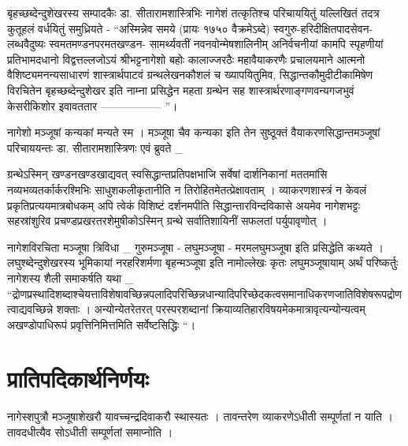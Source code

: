 बृहच्छब्देन्दुशेखरस्य सम्पादकैः डा. सीतारामशास्त्रिभिः नागेशं तत्कृतिश्च परिचाययितुं यल्लिखितं तदत्र कुतूहलं वर्धयितुं समुध्रियते - “अस्मिन्नेव समये (प्रायः १७५० वैक्रमेऽब्दे) स्वगुरु-हरिदीक्षितपादसेवन-लब्धवैदुष्यः स्वमतमण्डनपरमतखण्डन- सामर्थ्यवतीं नवनवोन्मेषशालिनीम् अनिर्वचनीयां कामपि स्पृहणीयां प्रतिभामदधानो विद्वत्तल्लजोऽयं श्रीभट्टनागेशो बहोः कालाज्जरठैः महावैयाकरणैः प्रचालयमाने आत्मनो वैशिष्ट्यमनन्यसाधारणं शास्त्रार्थपाटवं ग्रन्थलेखनकौशलं च ख्यापयितुमिव, सिद्धान्तकौमुदीटीकामिषेण विरचितेन बृहच्छब्देन्दुशेखर इति नाम्ना प्रसिद्धेन महता ग्रन्थेन सह शास्त्रार्थरणाङ्गणवन्यगजभुवं केसरीकिशोर इवावततार ----------------- ”।

नागेशो मञ्जूषां कन्यकां मन्यते स्म । मञ्जूषा चैव कन्यका इति तेन सुष्ठूक्तं वैयाकरणसिद्धान्तमञ्जूषां परिचाययन्तः डा. सीतारामशास्त्रिणः एवं ब्रुवते _

ग्रन्थेऽस्मिन् खण्डनखण्डखाद्यवत् स्वसिद्धान्तप्रतिपक्षभाजि सर्वेषां दार्शनिकानां मततमांसि नव्यभव्यतर्कार्करश्मिभिः साधुशकलीकृतानीति न तिरोहितमेतत्प्रेक्षावताम् । व्याकरणशास्त्रं न केवलं प्रकृतिप्रत्ययमात्रबोधकम् अपि त्वेकं विशिष्टं दर्शनमपीति सिद्धान्तारविन्दविकासे अयमेव नागेशभट्टः सहस्रांशुरिव प्रचण्डप्रखरतरशेमुषीकोऽस्मिन् ग्रन्थे सर्वातिशायिनीं सफलतां पर्युपावृणोत् ।

नागेशविरचिता मञ्जूषा त्रिविधा _ गुरुमञ्जूषा - लघुमञ्जूषा - मरमलघुमञ्जूषा इति प्रसिद्धेति कथ्यते । लघुश्ब्देन्दुशेखरस्य भूमिकायां नरहरिशर्मणा बृहन्मञ्जूषा इति नामोल्लेखः कृतः लघुमञ्जूषायाम् अर्थं परिष्कर्तुः नागेशस्य शैली समाकर्षति यथा _ “द्रोणप्रस्थादिशब्दाश्चेयत्ताविशेषावच्छिन्नपलादिपरिच्छिन्नधान्यादिपरिच्छेदकत्वसमानाधिकरणजातिविशेषरूपद्रोणत्वाद्यवच्छिन्ने शक्ताः । अन्योन्येतरेतरत् परस्परशब्दानां क्रियाव्यतिहारविषयमेकमात्रावृत्यन्योन्यत्वम् अखण्डोपाधिरूपं प्रवृत्तिनिमित्तमिति सर्वेष्टसिद्धिः “।

\section*{प्रातिपदिकार्थनिर्णयः}

नागेस्शपुत्रौ मञ्जूषाशेखरौ यावच्चन्द्रदिवाकरौ स्थास्यतः । तावन्तरेण व्याकरणेऽधीती सम्पूर्णतां न याति । तावदधीत्यैव सोऽधीती सम्पूर्णतां समाप्नोति ।

